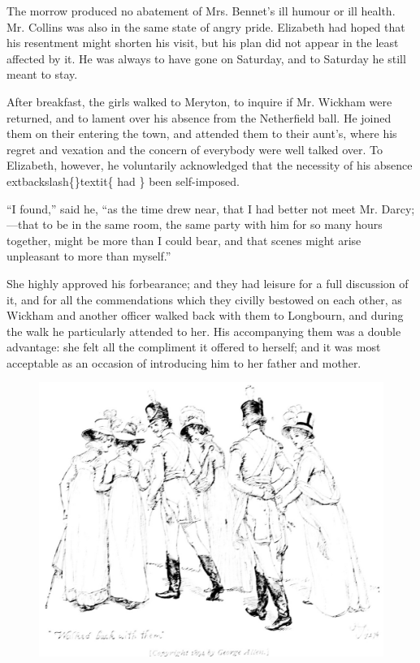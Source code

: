 \documentclass[10pt]{book}
\begin{document}
   The morrow produced no abatement of Mrs. Bennet’s ill humour or ill
health. Mr. Collins was also in the same state of angry pride. Elizabeth
had hoped that his resentment might shorten his visit, but his plan did
not appear in the least affected by it. He was always to have gone on
Saturday, and to Saturday he still meant to stay.
  

   After breakfast, the girls walked to Meryton, to inquire if Mr. Wickham
were returned, and to lament over his absence from the Netherfield ball.
He joined them on their entering the town, and attended them to their
aunt’s, where his regret and vexation and the concern of everybody were
well talked over. To Elizabeth, however, he voluntarily acknowledged
that the necessity of his absence
   	extbackslash\{\}textit\{
    had
   \}
   been self-imposed.
  

   “I found,” said he, “as the time drew near, that I had better not meet
Mr. Darcy;—that to be in the same room, the same party with him for so
many hours together, might be more than I could bear, and that scenes
might arise unpleasant to more than myself.”
  

   She highly approved his forbearance; and they had leisure for a full
discussion of it, and for all the commendations which they civilly
bestowed on each other, as Wickham and another officer walked back with
them to Longbourn, and during the walk he particularly attended to her.
His accompanying them was a double advantage: she felt all the
compliment it offered to herself;
   and it was most acceptable as an
occasion of introducing him to her father and mother.
  

\begin{figure}[h]
\centering
\includegraphics[width=\linewidth]{images/i_177.jpg}
\end{figure}
\end{document}
